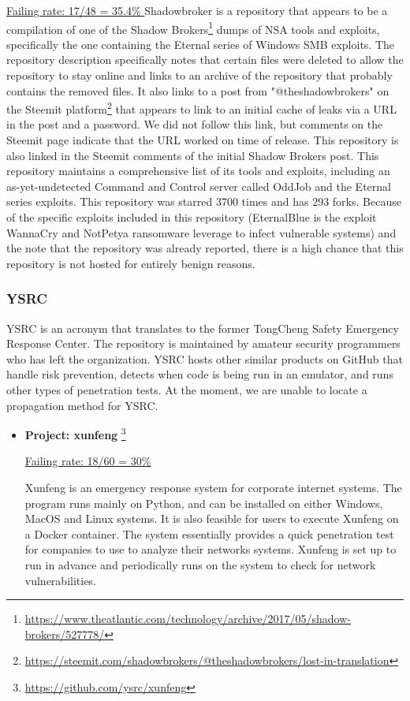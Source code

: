 \documentclass[]{acmart}
\begin{document}
\begin{itemize}
    \underline{ Failing rate: 17/48 = 35.4\% }
    Shadowbroker is a repository that appears to be a compilation of one of the Shadow Brokers\footnote{\url{https://www.theatlantic.com/technology/archive/2017/05/shadow-brokers/527778/}} dumps of NSA tools and exploits, specifically the one containing the Eternal series of Windows SMB exploits. The repository description specifically notes that certain files were deleted to allow the repository to stay online and links to an archive of the repository that probably contains the removed files. It also links to a post from "@theshadowbrokers" on the Steemit platform\footnote{\url{https://steemit.com/shadowbrokers/@theshadowbrokers/lost-in-translation}} that appears to link to an initial cache of leaks via a URL in the post and a password. We did not follow this link, but comments on the Steemit page indicate that the URL worked on time of release. This repository is also linked in the Steemit comments of the initial Shadow Brokers post. This repository maintains a comprehensive list of its tools and exploits, including an as-yet-undetected Command and Control server called OddJob and the Eternal series exploits. This repository was starred 3700 times and has 293 forks. Because of the specific exploits included in this repository (EternalBlue is the exploit WannaCry and NotPetya ransomware leverage to infect vulnerable systems) and the note that the repository was already reported, there is a high chance that this repository is not hosted for entirely benign reasons.
\end{itemize}
\subsubsection{YSRC}
YSRC is an acronym that translates to the former TongCheng Safety Emergency Response Center. The repository is maintained by amateur security programmers who has left the organization. YSRC hosts other similar products on GitHub that handle risk prevention, detects when code is being run in an emulator, and runs other types of penetration tests. At the moment, we are unable to locate a propagation method for YSRC. 
\begin{itemize}
    \item { \bf Project: xunfeng }\footnote{\url{https://github.com/ysrc/xunfeng}}
    
    \underline{ Failing rate: 18/60 = 30\% }
    
    Xunfeng is an emergency response system for corporate internet systems. The program runs mainly on Python, and can be installed on either Windows, MacOS and Linux systems. It is also feasible for users to execute Xunfeng on a Docker container. The system essentially provides a quick penetration test for companies to use to analyze their networks systems. Xunfeng is set up to run in advance and periodically runs on the system to check for network vulnerabilities. 
\end{itemize}
\end{document}

